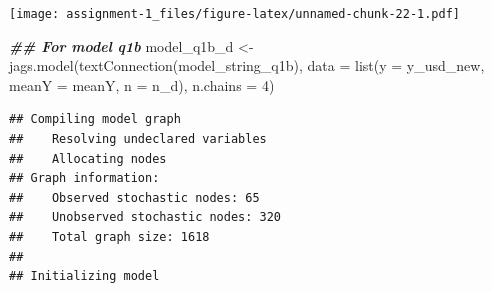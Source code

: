 \documentclass[
]{article}
\newenvironment{Shaded}{\begin{snugshade}}{\end{snugshade}}
\newcommand{\AttributeTok}[1]{\textcolor[rgb]{0.77,0.63,0.00}{#1}}
\newcommand{\DecValTok}[1]{\textcolor[rgb]{0.00,0.00,0.81}{#1}}
\newcommand{\DocumentationTok}[1]{\textcolor[rgb]{0.56,0.35,0.01}{\textbf{\textit{#1}}}}
\newcommand{\FunctionTok}[1]{\textcolor[rgb]{0.00,0.00,0.00}{#1}}
\newcommand{\NormalTok}[1]{#1}
\newcommand{\OtherTok}[1]{\textcolor[rgb]{0.56,0.35,0.01}{#1}}
\begin{document}
\texttt{[image: assignment-1\_files/figure-latex/unnamed-chunk-22-1.pdf]}

\begin{Shaded}
\begin{Highlighting}[]
\DocumentationTok{\#\# For model q1b}
\NormalTok{model\_q1b\_d }\OtherTok{\textless{}{-}} \FunctionTok{jags.model}\NormalTok{(}\FunctionTok{textConnection}\NormalTok{(model\_string\_q1b), }
                      \AttributeTok{data =} \FunctionTok{list}\NormalTok{(}\AttributeTok{y =}\NormalTok{ y\_usd\_new, }\AttributeTok{meanY =}\NormalTok{ meanY,  }\AttributeTok{n =}\NormalTok{ n\_d), }\AttributeTok{n.chains =} \DecValTok{4}\NormalTok{)}
\end{Highlighting}
\end{Shaded}

\begin{verbatim}
## Compiling model graph
##    Resolving undeclared variables
##    Allocating nodes
## Graph information:
##    Observed stochastic nodes: 65
##    Unobserved stochastic nodes: 320
##    Total graph size: 1618
## 
## Initializing model
\end{verbatim}
\end{document}
